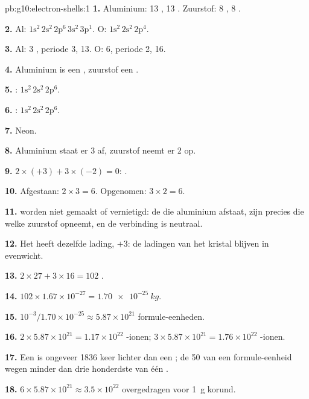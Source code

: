 \begin{solution}{pb:g10:electron-shells:1}
\textbf{1.} Aluminium: 13 , 13 . Zuurstof: 8 ,
8 .

\textbf{2.} Al: $1\mathrm{s}^2\,2\mathrm{s}^2\,2\mathrm{p}^6\,3\mathrm{s}^2\,3\mathrm{p}^1$.
O: $1\mathrm{s}^2\,2\mathrm{s}^2\,2\mathrm{p}^4$.

\textbf{3.} Al: 3 , periode 3,  13. O: 6,
periode 2,  16.

\textbf{4.} Aluminium is een , zuurstof een .

\textbf{5.} : $1\mathrm{s}^2\,2\mathrm{s}^2\,2\mathrm{p}^6$.

\textbf{6.} : $1\mathrm{s}^2\,2\mathrm{s}^2\,2\mathrm{p}^6$.

\textbf{7.} Neon.

\textbf{8.} Aluminium staat er 3 af, zuurstof neemt er 2 op.

\textbf{9.} $2 \times (+3) + 3 \times (-2) = 0$: .

\textbf{10.} Afgestaan: $2 \times 3 = 6$. Opgenomen: $3 \times 2 = 6$.

\textbf{11.}  worden niet gemaakt of vernietigd: de 
die aluminium afstaat, zijn precies die welke zuurstof opneemt, en de
verbinding is neutraal.

\textbf{12.} Het heeft dezelfde lading, $+3$: de ladingen van het
kristal blijven in evenwicht.

\textbf{13.} $2 \times 27 + 3 \times 16 = 102$ .

\textbf{14.} $102 \times 1.67 \times 10^{-27} = \qty{1.70e-25}{kg}$.

\textbf{15.} $10^{-3} / 1.70 \times 10^{-25} \approx 5.87 \times 10^{21}$
formule-eenheden.

\textbf{16.} $2 \times 5.87 \times 10^{21} = 1.17 \times 10^{22}$
-ionen; $3 \times 5.87 \times 10^{21} = 1.76 \times 10^{22}$
-ionen.

\textbf{17.} Een  is ongeveer 1836 keer lichter dan een ;
de 50  van een formule-eenheid wegen minder dan drie
honderdste van één .

\textbf{18.} $6 \times 5.87 \times 10^{21} \approx 3.5 \times 10^{22}$
 overgedragen voor \qty{1}{g} korund.
\end{solution}
